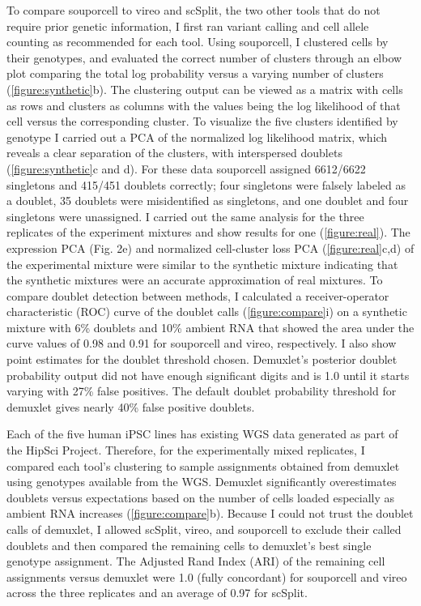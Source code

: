 \par{
To compare souporcell to vireo and scSplit, the two other tools that do not require prior genetic information, I first ran variant calling and cell allele counting as recommended for each tool. Using souporcell, I clustered cells by their genotypes, and evaluated the correct number of clusters through an elbow plot comparing the total log probability versus a varying number of clusters (\ref{figure:synthetic}b). The clustering output can be viewed as a matrix with cells as rows and clusters as columns with the values being the log likelihood of that cell versus the corresponding cluster. To visualize the five clusters identified by genotype I carried out a PCA of the normalized log likelihood matrix, which reveals a clear separation of the clusters, with interspersed doublets (\ref{figure:synthetic}c and d).  For these data souporcell assigned 6612/6622 singletons and 415/451 doublets correctly; four singletons were falsely labeled as a doublet, 35 doublets were misidentified as singletons, and one doublet and four singletons were unassigned. I carried out the same analysis for the three replicates of the  experiment mixtures and show results for one (\ref{figure:real}). The expression PCA (Fig. 2e) and normalized cell-cluster loss PCA (\ref{figure:real}c,d) of the experimental mixture were similar to the synthetic mixture indicating that the synthetic mixtures were an accurate approximation of real mixtures. To compare doublet detection between methods, I calculated a receiver-operator characteristic (ROC) curve of the doublet calls (\ref{figure:compare}i) on a synthetic mixture with 6\% doublets and 10\% ambient RNA that showed the area under the curve values of 0.98 and 0.91 for souporcell and vireo, respectively. I also show point estimates for the doublet threshold chosen. Demuxlet's posterior doublet probability output did not have enough significant digits and is 1.0 until it starts varying with 27\% false positives. The default doublet probability threshold for demuxlet gives nearly 40\% false positive doublets.
} 

\par{
Each of the five human iPSC lines has existing WGS data generated as part of the HipSci Project\cite{hipsci2}. Therefore, for the experimentally mixed replicates, I compared each tool's clustering to sample assignments obtained from demuxlet using genotypes available from the WGS. Demuxlet significantly overestimates doublets versus expectations based on the number of cells loaded\cite{10xsinglecell} especially as ambient RNA increases (\ref{figure:compare}b). Because I could not trust the doublet calls of demuxlet, I allowed scSplit, vireo, and souporcell to exclude their called doublets and then compared the remaining cells to demuxlet's best single genotype assignment. The Adjusted Rand Index (ARI) of the remaining cell assignments versus demuxlet were 1.0 (fully concordant) for souporcell and vireo across the three replicates and an average of 0.97 for scSplit.
} 


